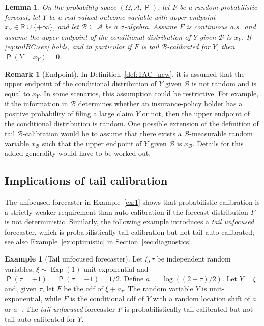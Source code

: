 \documentclass[12pt]{article}
\newcommand{\Q}{\operatorname{\mathsf{P}}}
\newcommand{\R}{\mathbb{R}}
\newcommand{\Aa}{\mathcal{A}}
\newcommand{\Bb}{\mathcal{B}}
\newcommand{\Exp}{\operatorname{Exp}} %
\newcommand{\1}{\mathbf{1}} %
\newtheorem{lemma}[propo]{Lemma}
\theoremstyle{definition}
\newtheorem{remark}[propo]{Remark}
\newtheorem{example}[propo]{Example}
\begin{document}
\begin{lemma}
    \label{lem:endpoint}
    On the probability space $(\Omega, \Aa, \Q)$, let $F$ be a random probabilistic forecast, let $Y$ be a real-valued outcome variable with upper endpoint $x_Y \in \R \cup \{+\infty\}$, and let $\Bb \subseteq \Aa$ be a $\sigma$-algebra. Assume $F$ is continuous a.s.\ and assume the upper endpoint of the conditional distribution of $Y$ given $\Bb$ is $x_Y$. If \eqref{eq:tailBC:sev} holds, and in particular if $F$ is tail $\Bb$-calibrated for $Y$, then $\Q(Y = x_Y) = 0$.
\end{lemma}

\begin{remark}[Endpoint]
    \label{rem:endpoint}
    In Definition~\ref{def:TAC_new}, it is assumed that the upper endpoint of the conditional distribution of $Y$ given $\Bb$ is not random and is equal to $x_Y$. In some scenarios, this assumption could be restrictive. For example, if the information in $\Bb$ determines whether an insurance-policy holder has a positive probability of filing a large claim $Y$ or not, then the upper endpoint of the conditional distribution is random. One possible extension of the definition of tail $\Bb$-calibration would be to assume that there exists a $\Bb$-measurable random variable $x_{\Bb}$ such that the upper endpoint of $Y$ given $\Bb$ is $x_{\Bb}$. Details for this added generality would have to be worked out.
\end{remark}

\subsection{Implications of tail calibration}


The unfocused forecaster in Example~\ref{ex:1} shows that probabilistic calibration is a strictly weaker requirement than auto-calibration if the forecast distribution $F$ is not deterministic. Similarly, the following example introduces a \emph{tail unfocused} forecaster, which is probabilistically tail calibration but not tail auto-calibrated; see also Example~\ref{ex:optimistic} in Section~\ref{sec:diagnostics}. 

\begin{example}[Tail unfocused forecaster]\label{ex:12}
Let $\xi, \tau$ be independent random variables, $\xi \sim \Exp(1)$ unit-exponential and $\Q(\tau = +1) = \Q(\tau = - 1) = 1/2$. Define $a_{\tau} = \log \left( (2 + \tau) / 2 \right)$. Let $Y = \xi$ and, given $\tau$, let $F$ be the cdf of $\xi + a_{\tau}$. The random variable $Y$ is unit-exponential, while $F$ is the conditional cdf of $Y$ with a random location shift of $a_+$ or $a_-$. The \emph{tail unfocused} forecaster $F$ is probabilistically tail calibrated but not tail auto-calibrated for $Y$. 
\end{example}
\end{document}
